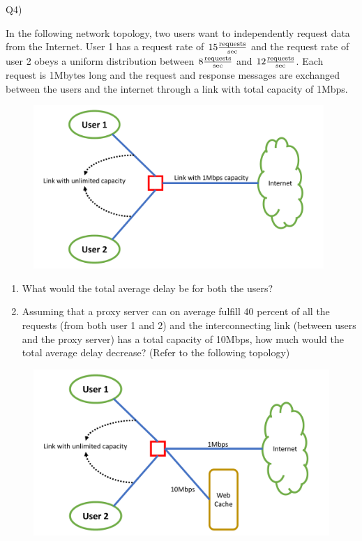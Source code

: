 \documentclass[10pt,letterpaper]{article}
\begin{document}
Q4)

In the following network topology, two users want to independently request data from the Internet. User 1 has a request rate of $15{\text{requests}\over \text{sec}}$ and the request rate of user 2 obeys a uniform distribution between $8{\text{requests}\over \text{sec}}$ and $12{\text{requests}\over \text{sec}}$. Each request is 1Mbytes long and the request and response messages are exchanged between the users and the internet through a link with total capacity of 1Mbps.

\begin{figure}[h!]
\centering
\includegraphics[width=110mm]{HW2_Q.pdf}
\end{figure}

\begin{enumerate}[label=\alph*-]
\item
What would the total average delay be for both the users?
\item
Assuming that a proxy server can on average fulfill 40 percent of all the requests (from both user 1 and 2) and the interconnecting link (between users and the proxy server) has a total capacity of 10Mbps, how much would the total average delay decrease? (Refer to the following topology)
\end{enumerate}

\begin{figure}[h!]
\centering
\includegraphics[width=120mm]{HW2_Q_.pdf}
\end{figure}
\end{document}

